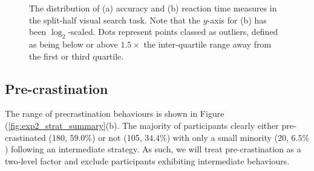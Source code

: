 \documentclass[]{rsos}
\begin{document}
\begin{figure}[t]
  \centering  
  \caption{The distribution of (a) accuracy and (b) reaction time measures in the split-half visual search task. Note that the $y$-axis for (b) has been $\log_2$-scaled. Dots represent points classed as outliers, defined as being below or above $1.5 \times$ the inter-quartile range away from the first or third quartile.}
  \label{fig:exp2_summary}
\end{figure}

\subsection{Pre-crastination}

The range of precrastination behaviours is shown in Figure (\ref{fig:exp2_strat_summary}(b). The majority of participants clearly either pre-crastinated (180, $59.0\%$) or not (105, $34.4\%$) with only a small minority (20, $6.5\%$) following an intermediate strategy. As such, we will treat pre-crastination as a two-level factor and exclude participants exhibiting intermediate behaviours. 
\end{document}
